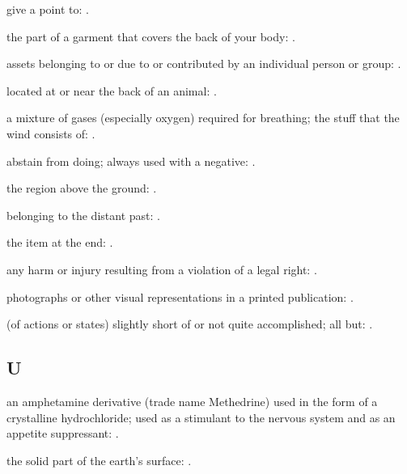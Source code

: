   give a point to:   .

  the part of a garment that covers the back of your body: .

  assets belonging to or due to or contributed by an individual person or group:   .

  located at or near the back of an animal:   .

  a mixture of gases (especially oxygen) required for breathing; the stuff that the wind consists of: .

  abstain from doing; always used with a negative:   .

  the region above the ground: .

  belonging to the distant past:   .

  the item at the end:   .

  any harm or injury resulting from a violation of a legal right: .

  photographs or other visual representations in a printed publication:   .

  (of actions or states) slightly short of or not quite accomplished; all but:   .

\subsection*{U}

  an amphetamine derivative (trade name Methedrine) used in the form of a crystalline hydrochloride; used as a stimulant to the nervous system and as an appetite suppressant:   .

  the solid part of the earth's surface:   .

